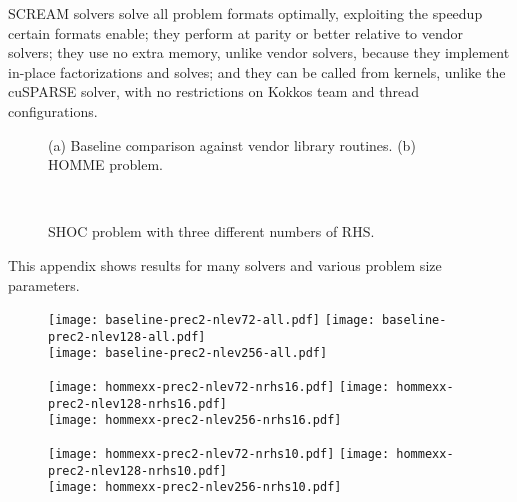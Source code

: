 \documentclass[10pt,twocolumn]{article}
\begin{document}
 SCREAM solvers solve all problem formats optimally,
exploiting the speedup certain formats enable;
they perform at parity or better relative to vendor solvers;
they use no extra memory, unlike vendor solvers, because they implement in-place factorizations and solves;
and they can be called from kernels, unlike the cuSPARSE solver, with no restrictions on Kokkos team and thread configurations.

\onecolumn

\begin{figure}[hbt]
  \centering
  \caption{(a) Baseline comparison against vendor library routines.
  (b) HOMME problem.} \label{fig:one}
\end{figure}
\begin{figure}[hbt]
  \centering
   \\
  \caption{SHOC problem with three different numbers of RHS.} \label{fig:shoc}
\end{figure}

\clearpage
{}
This appendix shows results for many solvers and various problem size parameters.

\begin{figure}[hbt]
  \centering
  \texttt{[image: baseline-prec2-nlev72-all.pdf]}
  \texttt{[image: baseline-prec2-nlev128-all.pdf]} \\
  \texttt{[image: baseline-prec2-nlev256-all.pdf]}
\end{figure}

\begin{figure}[hbt]
  \centering
  \texttt{[image: hommexx-prec2-nlev72-nrhs16.pdf]}
  \texttt{[image: hommexx-prec2-nlev128-nrhs16.pdf]} \\
  \texttt{[image: hommexx-prec2-nlev256-nrhs16.pdf]}
\end{figure}

\begin{figure}[hbt]
  \centering
  \texttt{[image: hommexx-prec2-nlev72-nrhs10.pdf]}
  \texttt{[image: hommexx-prec2-nlev128-nrhs10.pdf]} \\
  \texttt{[image: hommexx-prec2-nlev256-nrhs10.pdf]}
\end{figure}
\end{document}
